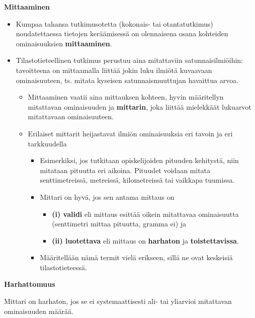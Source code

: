 \documentclass[
]{book}
\providecommand{\tightlist}{%
  \setlength{\itemsep}{0pt}\setlength{\parskip}{0pt}}
\begin{document}
\textbf{Mittaaminen}

\begin{itemize}
\tightlist
\item
  Kumpaa tahansa tutkimusotetta (kokonais- tai otantatutkimus) noudatettaessa tietojen keräämisessä on olennaisena osana kohteiden ominaisuuksien \textbf{mittaaminen}.
\item
  Tilastotieteellinen tutkimus perustuu aina mitattaviin satunnaisilmiöihin: tavoitteena on mittaamalla liittää jokin luku ilmiötä kuvaavaan ominaisuuteen, ts. mitata kyseisen satunnaismuuttujan havaittua arvoa.

  \begin{itemize}
  \tightlist
  \item
    Mittaaminen vaatii aina mittauksen kohteen, hyvin määritellyn mitattavan ominaisuuden ja \textbf{mittarin}, joka liittää mielekkäät lukuarvot mitattavaan ominaisuuteen.
  \item
    Erilaiset mittarit heijastavat ilmiön ominaisuuksia eri tavoin ja eri tarkkuudella

    \begin{itemize}
    \tightlist
    \item
      Esimerkiksi, jos tutkitaan opiskelijoiden pituuden kehitystä, niin mitataan pituutta eri aikoina. Pituudet voidaan mitata senttimetreissä, metreissä, kilometreissä tai vaikkapa tuumissa.
    \item
      Mittari on hyvä, jos sen antama mittaus on

      \begin{itemize}
      \tightlist
      \item
        \textbf{(i) validi} eli mittaus esittää oikein mitattavaa ominaisuutta (senttimetri mittaa pituutta, gramma ei) ja
      \item
        \textbf{(ii) luotettava} eli mittaus on \textbf{harhaton} ja \textbf{toistettavissa}.
      \end{itemize}
    \item
      Määritellään nämä termit vielä erikseen, sillä ne ovat keskeisiä tilastotieteessä.
    \end{itemize}
  \end{itemize}
\end{itemize}

\begin{defblock}{}
\textbf{Harhattomuus}

Mittari on harhaton, jos se ei systemaattisesti ali- tai yliarvioi mitattavan ominaisuuden määrää.

\end{defblock}
\end{document}
